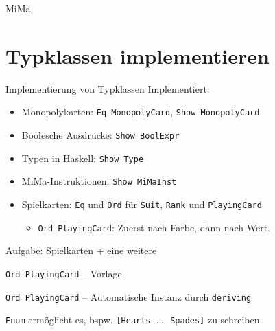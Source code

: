 \documentclass{beamer}
\begin{document}
\begin{frame}{MiMa}
\end{frame}

\section{Typklassen implementieren}

\begin{frame}{Implementierung von Typklassen}
  Implementiert:

  \vfill

  \begin{itemize}
    \item Monopolykarten: \texttt{Eq MonopolyCard}, \texttt{Show MonopolyCard}
    \item Boolesche Ausdrücke: \texttt{Show BoolExpr}
    \item Typen in Haskell: \texttt{Show Type}
    \item MiMa-Instruktionen: \texttt{Show MiMaInst}
    \item Spielkarten: \texttt{Eq} und \texttt{Ord} für \texttt{Suit}, \texttt{Rank} und \texttt{PlayingCard}
    \begin{itemize}
      \item \texttt{Ord PlayingCard}: Zuerst nach Farbe, dann nach Wert.
    \end{itemize}
  \end{itemize}

  \vfill
  
  Aufgabe: Spielkarten + eine weitere
\end{frame}

\begin{frame}{\texttt{Ord PlayingCard} -- Vorlage}
\end{frame}

\begin{frame}{\texttt{Ord PlayingCard} -- Automatische Instanz durch \texttt{deriving}}

  \texttt{Enum} ermöglicht es, bspw. \texttt{[Hearts .. Spades]} zu schreiben.
\end{frame}
\end{document}
